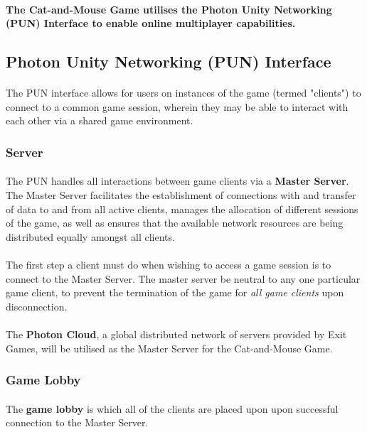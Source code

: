\documentclass[12pt, titlepage]{article}
\begin{document}
\paragraph{} \textbf{The Cat-and-Mouse Game utilises the Photon Unity Networking (PUN) Interface to enable online multiplayer capabilities.}
\subsection{Photon Unity Networking (PUN) Interface}
\paragraph{} The PUN interface allows for users on instances of the game (termed "clients") to connect to a common game session, wherein they may be able to interact with each other via a shared game environment.
\subsubsection{Server}
\paragraph{}The PUN handles all interactions between game clients via a \textbf{Master Server}. The Master Server facilitates the establishment of connections with and transfer of data to and from all active clients, manages the allocation of different sessions of the game, as well as  ensures that the available network resources are being distributed equally amongst all clients.
\paragraph{}The first step a client must do when wishing to access a game session is to connect to the Master Server. The master server be neutral to any one particular game client, to prevent the termination of the game for \emph{all game clients} upon disconnection.
\paragraph{}The \textbf{Photon Cloud}, a global distributed network of servers provided by Exit Games, will be utilised as the Master Server for the Cat-and-Mouse Game.
\subsubsection{Game Lobby}
\paragraph{}The \textbf{game lobby} is which all of the clients are placed upon upon successful connection to the Master Server. 
\end{document}
